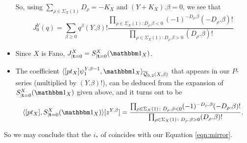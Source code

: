 \begin{itemize}[leftmargin=*]
\[ \]
So, using $\sum_{\rho\in\Sigma_X(1)} D_{\rho}=-K_X$ and $(Y+K_X).\beta=0$, we see that
\[
 J^Y_0(q)=\sum_{\beta\geq 0}q^\beta(Y.\beta)!\frac{\prod_{\rho\in\Sigma_X(1)\colon D_\rho.\beta< 0}(-1)^{-D_{\rho}.\beta}(-D_{\rho}.\beta)!}{\prod_{\rho\in\Sigma_X(1)\colon D_\rho.\beta> 0}(D_{\rho}.\beta)!}
\]
\item Since $X$ is Fano, $J^X_{|{\bf t}=0}=S^X_{|{\bf t}=0}(\mathbbm 1_X)$.
\item The coefficient $\langle[pt_X]\psi_1^{Y.\beta-1},\mathbbm 1_X\rangle_{\Q{0}{2}{X}{\beta}}$ that appears in our $P$-series (multiplied by $(Y.\beta)!$), can be deduced from the expansion of $S^X_{|{\bf t}=0}(\mathbbm 1_X)$ given above, and it turns out to be
\[
 \langle [pt_X],S^X_{|{\bf t}=0}(\mathbbm 1_X)\rangle[z^{Y.\beta}]=\frac{\prod_{\rho\in\Sigma_X(1)\colon D_\rho.\beta< 0}(-1)^{-D_{\rho}.\beta}(-D_{\rho}.\beta)!}{\prod_{\rho\in\Sigma_X(1)\colon D_\rho.\beta> 0}(D_{\rho}.\beta)!}.
\]

\end{itemize}

So we may conclude that the $i_*$ of \cite[Corollary 5.5.1]{CF-K-wallcrossing} coincides with our Equation \ref{eqn:mirror}.